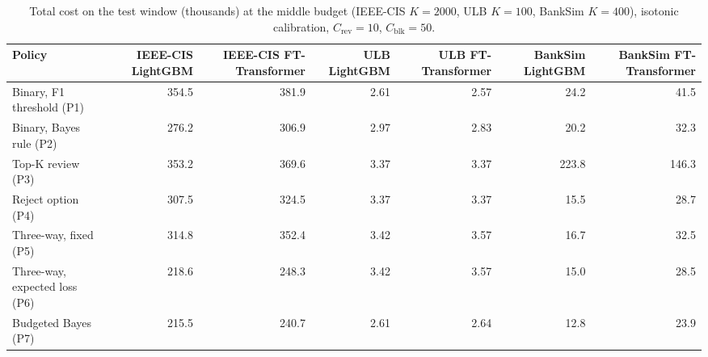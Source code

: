\begin{table}[t]
\centering
\caption{Total cost on the test window (thousands) at the middle budget (IEEE-CIS $K=2000$, ULB $K=100$, BankSim $K=400$), isotonic calibration, $C_{\mathrm{rev}}=10$, $C_{\mathrm{blk}}=50$.}
\label{tab:costs}
\begin{tabular}{lrrrrrr}
\toprule
Policy & IEEE-CIS LightGBM & IEEE-CIS FT-Transformer & ULB LightGBM & ULB FT-Transformer & BankSim LightGBM & BankSim FT-Transformer \\
\midrule
Binary, F1 threshold (P1) & 354.5 & 381.9 & 2.61 & 2.57 & 24.2 & 41.5 \\
Binary, Bayes rule (P2) & 276.2 & 306.9 & 2.97 & 2.83 & 20.2 & 32.3 \\
Top-K review (P3) & 353.2 & 369.6 & 3.37 & 3.37 & 223.8 & 146.3 \\
Reject option (P4) & 307.5 & 324.5 & 3.37 & 3.37 & 15.5 & 28.7 \\
Three-way, fixed (P5) & 314.8 & 352.4 & 3.42 & 3.57 & 16.7 & 32.5 \\
Three-way, expected loss (P6) & 218.6 & 248.3 & 3.42 & 3.57 & 15.0 & 28.5 \\
Budgeted Bayes (P7) & 215.5 & 240.7 & 2.61 & 2.64 & 12.8 & 23.9 \\
\bottomrule
\end{tabular}
\end{table}
